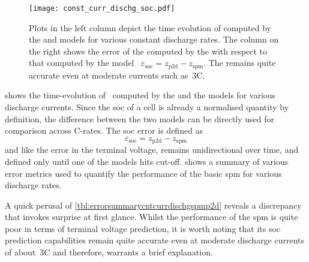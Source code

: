 \begin{figure}[!htb]
    \centering
    \texttt{[image: const\_curr\_dischg\_soc.pdf]}
    \caption[ computed by  and
     models for constant current discharge]{Plots in the left
        column depict the time evolution of  computed by the
         and  models for various constant
        discharge rates. The column on the right shows the error of the
         computed by the  with respect to that
        computed by the  model \ie~$ \varepsilon_\text{soc}
        = {z_\text{p2d}} - z_\text{spm} $. The  remains quite
    accurate even at moderate currents such as~3C.}
    \label{fig:cnstdischgspmp2dsoc}
\end{figure}

  shows  the  time-evolution  of~
computed by the   and the   models for various
discharge  currents. Since  the  \gls{soc} of  a cell  is  already a  normalised
quantity by  definition, the difference between  the two models can  be directly
used for comparison across C-rates. The \gls{soc} error is defined as
\begin{equation}
    \varepsilon_\text{soc} = {z_\text{p2d}} - z_\text{spm}
\end{equation}
and   like  the   error  in   the  terminal   voltage,  remains   unidirectional
over  time,   and  defined  only   until  one   of  the  models   hits  cut-off.
  shows  a  summary of  various  error
metrics used  to quantify  the performance  of the  basic \gls{spm}  for various
discharge rates.



A   quick   perusal  of \cref{tbl:errorsummarycntcurrdischgspmp2d}   reveals   a
discrepancy that invokes surprise at first glance. Whilst the performance of the
\gls{spm} is  quite poor in  terms of terminal  voltage prediction, it  is worth
noting that its \gls{soc} prediction  capabilities remain quite accurate even at
moderate  discharge  currents  of  about~3C and  therefore,  warrants  a  brief
explanation.

